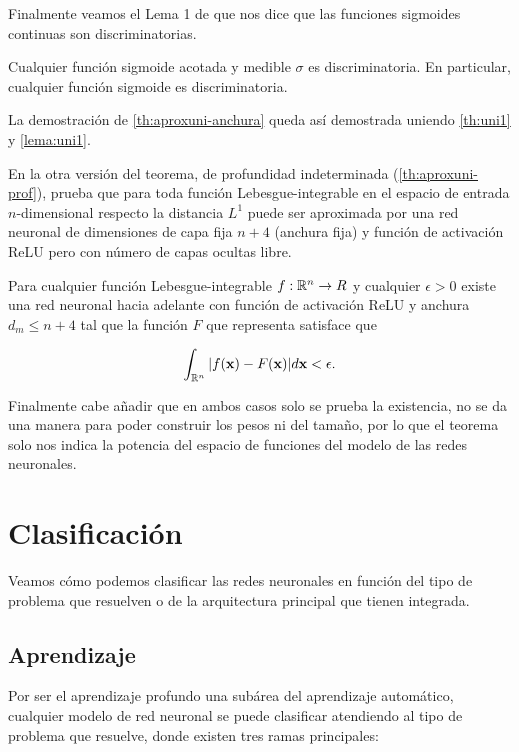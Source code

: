 Finalmente veamos el Lema 1 de \cite{cybenko1989approximation} que nos dice que las funciones sigmoides continuas son discriminatorias.

\begin{lema}
  Cualquier función sigmoide acotada y medible $\sigma$ es discriminatoria. En particular, cualquier función sigmoide es discriminatoria.
  \label{lema:uni1}
\end{lema}

La demostración de \autoref{th:aproxuni-anchura} queda así demostrada uniendo \autoref{th:uni1} y \autoref{lema:uni1}.

En la otra versión del teorema, de profundidad indeterminada (\autoref{th:aproxuni-prof}), prueba que para toda función Lebesgue-integrable en el espacio de entrada $n$-dimensional respecto la distancia $L^1$ puede ser aproximada por una red neuronal de dimensiones de capa fija $n + 4$ (anchura fija) y función de activación ReLU pero con número de capas ocultas libre.

\begin{teorema}
  Para cualquier función Lebesgue-integrable $f: \mathbb{R}^n \to R$ y cualquier $\epsilon > 0$ existe una red neuronal hacia adelante con función de activación ReLU y anchura $d_m \leq n + 4$ tal que la función $F$ que representa satisface que

  $$\int_{\mathbb{R}^n} |f(\textbf{x}) - F(\textbf{x})| d\textbf{x} < \epsilon.$$
  \label{th:aproxuni-prof}
\end{teorema}

Finalmente cabe añadir que en ambos casos solo se prueba la existencia, no se da una manera para poder construir los pesos ni del tamaño, por lo que el teorema solo nos indica la potencia del espacio de funciones del modelo de las redes neuronales.

\section{Clasificación}

Veamos cómo podemos clasificar las redes neuronales en función del tipo de problema que resuelven o de la arquitectura principal que tienen integrada.

\subsection{Aprendizaje}

Por ser el aprendizaje profundo una subárea del aprendizaje automático, cualquier modelo de red neuronal se puede clasificar atendiendo al tipo de problema que resuelve, donde existen tres ramas principales:

